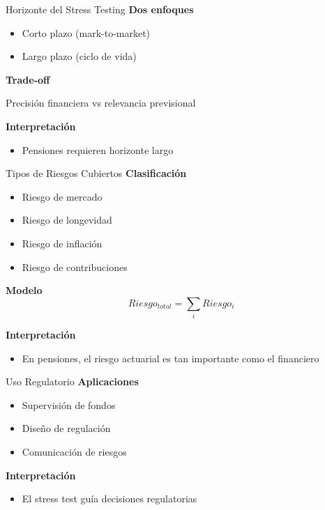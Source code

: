 \documentclass{beamer}
\begin{document}
\begin{frame}{Horizonte del Stress Testing}
\textbf{Dos enfoques}
\begin{itemize}
\item Corto plazo (mark-to-market)
\item Largo plazo (ciclo de vida)
\end{itemize}

\textbf{Trade-off}
\begin{block}{}
Precisión financiera vs relevancia previsional
\end{block}

\textbf{Interpretación}
\begin{itemize}
\item Pensiones requieren horizonte largo
\end{itemize}
\end{frame}

\begin{frame}{Tipos de Riesgos Cubiertos}
\textbf{Clasificación}
\begin{itemize}
\item Riesgo de mercado
\item Riesgo de longevidad
\item Riesgo de inflación
\item Riesgo de contribuciones
\end{itemize}

\textbf{Modelo}
\[
Riesgo_{total} = \sum_i Riesgo_i
\]

\textbf{Interpretación}
\begin{itemize}
\item En pensiones, el riesgo actuarial es tan importante como el financiero
\end{itemize}
\end{frame}


\begin{frame}{Uso Regulatorio}
\textbf{Aplicaciones}
\begin{itemize}
\item Supervisión de fondos
\item Diseño de regulación
\item Comunicación de riesgos
\end{itemize}

\textbf{Interpretación}
\begin{itemize}
\item El stress test guía decisiones regulatorias
\end{itemize}
\end{frame}
\end{document}

